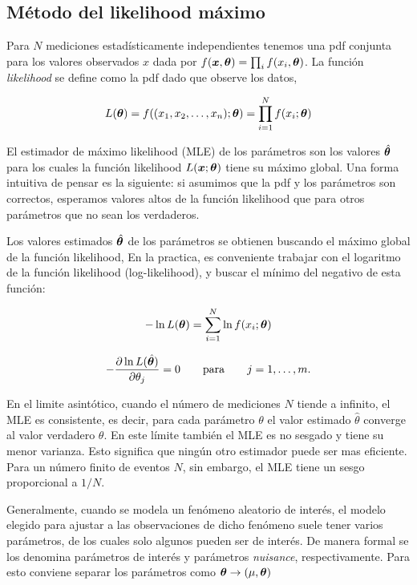 \subsection{Método del likelihood máximo}

Para $N$ mediciones estadísticamente independientes tenemos una pdf conjunta
para los valores observados $x$ dada por $f(\bm{x}, \bm{\theta}) = \prod_i f(x_i,
\bm{\theta})$. La función \emph{likelihood} se define como la pdf dado que observe los
datos,

\begin{equation}
  L(\bm{\theta}) = f((x_1, x_2, \ldots, x_n); \bm{\theta}) = \prod_{i=1}^{N} f(x_i;
  \bm{\theta})
\end{equation}

El estimador de máximo likelihood (MLE) de los parámetros {\btheta} son los
valores $\hat{\bm{\theta}}$ para los cuales la función likelihood
$L(\bm{x};\bm{\theta})$ tiene su máximo global. Una forma intuitiva de pensar es la
siguiente: si asumimos que la pdf y los parámetros son correctos, esperamos
valores altos de la función likelihood que para otros parámetros que no sean los
verdaderos.

Los valores estimados $\hat{\bm{\theta}}$ de los parámetros se obtienen buscando el
máximo global de la función likelihood, En la practica, es conveniente trabajar
con el logaritmo de la función likelihood (log-likelihood), y buscar el mínimo
del negativo de esta función:

\begin{equation}
  - \ln L(\bm{\theta}) = \sum_{i=1}^{N} \ln f(x_i; \bm{\theta})
\end{equation}

\begin{equation}
  - \frac{\partial \ln L(\hat{\bm{\theta}})}{\partial \theta_j} = 0 \qquad \text{para} \qquad j =
  1,\ldots,m.
\end{equation}

En el limite asintótico, cuando el número de mediciones $N$ tiende a infinito,
el MLE es consistente, es decir, para cada parámetro $\theta$ el valor estimado
$\hat{\theta}$ converge al valor verdadero $\theta$. En este límite también el
MLE es no sesgado y tiene su menor varianza. Esto significa que ningún otro
estimador puede ser mas eficiente. Para un número finito de eventos $N$, sin
embargo, el MLE tiene un sesgo proporcional a $1/N$.

Generalmente, cuando se modela un fenómeno aleatorio de interés, el modelo
elegido para ajustar a las observaciones de dicho fenómeno suele tener varios
parámetros, de los cuales solo algunos pueden ser de interés. De manera formal
se los denomina parámetros de interés y parámetros \emph{nuisance},
respectivamente. Para esto conviene separar los parámetros como $\bm{\theta} \rightarrow
(\mu, \bm{\theta})$

